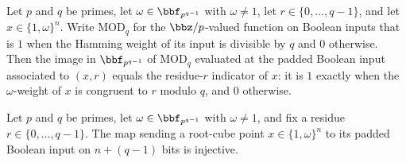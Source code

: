 \begin{theorem}
\label{RazborovSmolensky.paddedResidueInput_modQTarget_eq_residueIndicator}
\leanok
{}
Let $p$ and $q$ be primes, let $\omega \in \bbf_{p^{q-1}}$ with $\omega \neq 1$, let
$r \in \{0,\dots,q-1\}$, and let $x \in \{1,\omega\}^n$.  Write $\mathrm{MOD}_q$ for the
$\bbz/p$-valued function on Boolean inputs that is $1$ when the Hamming weight of its
input is divisible by $q$ and $0$ otherwise.  Then the image in $\bbf_{p^{q-1}}$ of
$\mathrm{MOD}_q$ evaluated at the padded Boolean input associated to $(x, r)$ equals the
residue-$r$ indicator of $x$: it is $1$ exactly when the $\omega$-weight of $x$ is
congruent to $r$ modulo $q$, and $0$ otherwise.
\end{theorem}

\begin{theorem}
\label{RazborovSmolensky.paddedResidueInput_injective}
\leanok
{}
Let $p$ and $q$ be primes, let $\omega \in \bbf_{p^{q-1}}$ with $\omega \neq 1$, and fix
a residue $r \in \{0,\dots,q-1\}$.  The map sending a root-cube point
$x \in \{1,\omega\}^n$ to its padded Boolean input on $n + (q-1)$ bits is injective.
\end{theorem}

